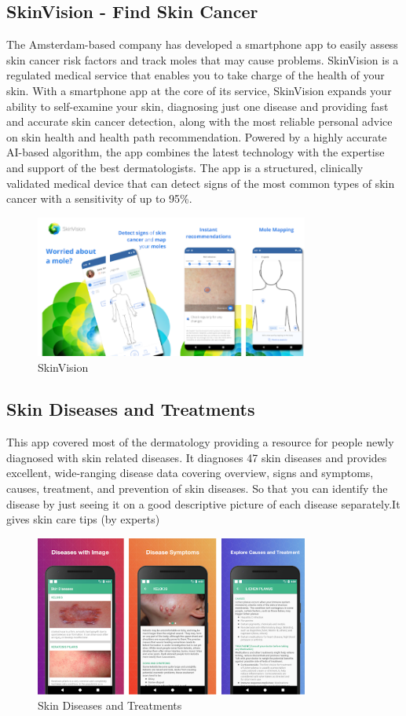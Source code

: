 \documentclass{article}
\begin{document}
\subsection{SkinVision -  Find Skin Cancer }The Amsterdam-based company has developed a smartphone app to easily assess skin cancer risk factors and track moles that may cause problems.
SkinVision is a regulated medical service that enables you to take charge of the health of your skin.
With a smartphone app at the core of its service, SkinVision expands your ability to self-examine your skin, diagnosing just one disease and providing fast and accurate skin cancer detection, along with the most reliable personal advice on skin health and health path recommendation.
Powered by a highly accurate AI-based algorithm, the app combines the latest technology with the expertise and support of the best dermatologists.
The app is a structured, clinically validated medical device that can detect signs of the most common types of skin cancer with a sensitivity of up to 95\%.
\begin{figure}[H]
 \centering 
 \includegraphics[heigH= 8cm, width=9cm]{Figures/SkinVision.PNG}
 \caption{SkinVision}
\end{figure}
\subsection{Skin Diseases and Treatments}This app covered most of the dermatology providing a resource for people newly diagnosed with skin related diseases. It diagnoses 47 skin diseases and provides excellent, wide-ranging disease data covering overview, signs and symptoms, causes, treatment, and prevention of skin diseases. So that you can identify the disease by just seeing it on a good descriptive picture of each disease separately.It gives skin care tips (by experts)
\begin{figure}[H]
 \centering 
 \includegraphics[heigH= 8cm, width=9cm]{Figures/SkinDandTreatment.PNG}
 \caption{Skin Diseases and Treatments}
\end{figure}
 
\end{document}
